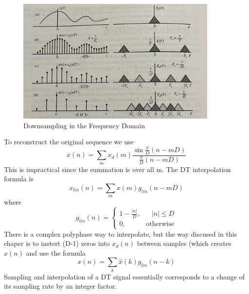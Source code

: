 \documentclass{article} %
\begin{document}
	\begin{figure}[h]
	\centering
	\includegraphics[width=10cm]{downsample}
	\caption{Downsampling in the Frequency Domain}
	\end{figure}
	To reconstruct the original sequence we use
	\begin{equation}
	x(n) = \sum_m x_d(m)\frac{\sin \frac{\pi}{D}(n-mD)}{\frac{\pi}{D}(n - mD)}
	\end{equation}
	This is impractical since the summation is over all m. The DT interpolation formula is
	\begin{equation}
	x_{lin}(n) = \sum_m x(m)g_{lin}(n-mD)
	\end{equation}
	where
	\begin{equation}
	g_{lin}(n) =  \begin{cases}
      		1 - \frac{|n|}{D}, & \;\;\; |n| \le D \\
      		0, & \text{otherwise}
    	\end{cases} 
	\end{equation}
	There is a complex polyphase way to interpolate, but the way discused in this chaper is to instert (D-1) zeros into $x_d(n)$ between samples (which creates $\hat{x}(n)$ and use the formula 
	\begin{equation}
	x(n) = \sum_k \hat{x}(k)g_{lin}(n-k)
	\end{equation}
	Sampling and interpolation of a DT signal essentially corresponds to a change of its sampling rate by an integer factor. 
	
	
\end{document}

